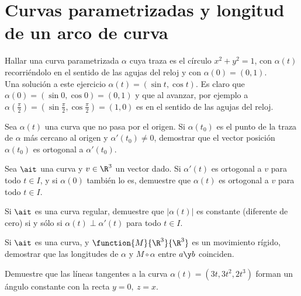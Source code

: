 \chapter{Curvas parametrizadas y longitud de un arco de curva}

\begin{ejercicio} Hallar una curva parametrizada $\alpha$ cuya traza es el círculo $x^2+y^2=1$, con $\alpha(t)$ recorriéndolo en el sentido de las agujas del reloj y con $\alpha(0) =(0,1)$.\\

Una solución a este ejercicio $\alpha(t)=(\sin t, \cos t)$. Es claro que $\alpha(0) =(\sin 0,\cos 0) =(0,1)$ y que al avanzar, por ejemplo a $\alpha(\frac{\pi}{2})=(\sin \frac{\pi}{2},\cos \frac{\pi}{2}) = (1,0)$ es en el sentido de las agujas del reloj.
\end{ejercicio}

\begin{ejercicio} Sea $\alpha(t)$  una curva que no pasa por el origen. Si $\alpha(t_0)$ es el punto de la traza de $\alpha$ más cercano al origen y $\alpha'(t_0)\neq 0$, demostrar que el vector posición $\alpha(t_0)$ es ortogonal a $\alpha'(t_0)$.\\


\end{ejercicio}

\begin{ejercicio} Sea $\ait$ una curva y $v\in\R^3$ un vector dado. Si $\alpha'(t)$ es ortogonal a $v$ para todo $t\in I$, y si $\alpha(0)$ también lo es, demuestre que $\alpha(t)$ es ortogonal a $v$ para todo $t\in I$.
\end{ejercicio}

\begin{ejercicio} Si $\ait$ es una curva regular, demuestre que $|\alpha(t)|$ es constante (diferente de cero) si y sólo si $\alpha(t) \perp \alpha'(t)$ para todo $t\in I$.
\end{ejercicio}

\begin{ejercicio} Si $\ait$ es una curva, y $\function{M}{\R^3}{\R^3}$ es un movimiento rígido, demostrar que las longitudes de $\alpha$ y $M\circ\alpha$ entre $a\y b$ coinciden.
\end{ejercicio}

\begin{ejercicio} Demuestre que las líneas tangentes a la curva $\alpha(t)=(3t,3t^2,2t^3)$ forman un ángulo constante con la recta $y=0,\ z=x$.
\end{ejercicio}
